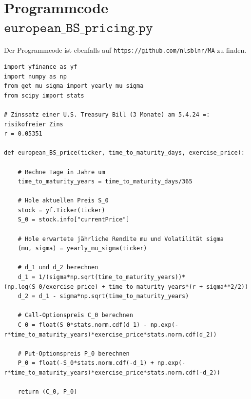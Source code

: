 \documentclass[11pt]{report} %
\begin{document}
\section{Programmcode $\texttt{european\_BS\_pricing.py}$}
Der Programmcode ist ebenfalls auf \texttt{https://github.com/nlsblnr/MA} zu finden.
\label{code:european_BS_pricing.py}
\begin{lstlisting}
import yfinance as yf
import numpy as np
from get_mu_sigma import yearly_mu_sigma
from scipy import stats

# Zinssatz einer U.S. Treasury Bill (3 Monate) am 5.4.24 =: risikofreier Zins
r = 0.05351

def european_BS_price(ticker, time_to_maturity_days, exercise_price):

    # Rechne Tage in Jahre um
    time_to_maturity_years = time_to_maturity_days/365

    # Hole aktuellen Preis S_0
    stock = yf.Ticker(ticker)
    S_0 = stock.info["currentPrice"]

    # Hole erwartete jährliche Rendite mu und Volatilität sigma
    (mu, sigma) = yearly_mu_sigma(ticker)

    # d_1 und d_2 berechnen
    d_1 = 1/(sigma*np.sqrt(time_to_maturity_years))*(np.log(S_0/exercise_price) + time_to_maturity_years*(r + sigma**2/2))
    d_2 = d_1 - sigma*np.sqrt(time_to_maturity_years)

    # Call-Optionspreis C_0 berechnen
    C_0 = float(S_0*stats.norm.cdf(d_1) - np.exp(-r*time_to_maturity_years)*exercise_price*stats.norm.cdf(d_2))

    # Put-Optionspreis P_0 berechnen
    P_0 = float(-S_0*stats.norm.cdf(-d_1) + np.exp(-r*time_to_maturity_years)*exercise_price*stats.norm.cdf(-d_2))

    return (C_0, P_0)
\end{lstlisting}
\end{document}
